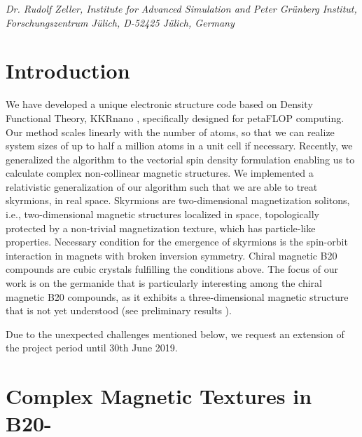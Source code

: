 \documentclass [a4paper, 12pt]{article}
\begin{document}
\phantom{MM} \textit{Dr. Rudolf Zeller,
Institute for Advanced Simulation and Peter Gr\"unberg Institut, Forschungszentrum J\"ulich, D-52425 J\"ulich, Germany
}



\newpage



\section{Introduction}
\label{sec:intro}
We have developed a unique electronic structure code based on Density Functional Theory, 
KKRnano \cite{zeller_towards_2008,thiess_massively_2012,bornemann_large-scale_nodate},
specifically designed for petaFLOP computing. Our method scales linearly
with the number of atoms, so that we can realize system sizes of up to 
half a million atoms in a unit cell if necessary.
Recently, we generalized the algorithm to the vectorial spin density formulation enabling us
to calculate complex non-collinear magnetic structures. We implemented a relativistic 
generalization  of our algorithm  such that we are able to treat skyrmions,
in real space. Skyrmions are two-dimensional magnetization solitons, i.e., two-dimensional
magnetic structures localized in space, topologically protected by a non-trivial
magnetization texture, which has particle-like properties. Necessary condition for the 
emergence of skyrmions is the spin-orbit interaction in magnets with broken inversion symmetry.
Chiral magnetic B20 compounds are cubic crystals fulfilling the conditions above. 
The focus of our work is on the germanide  that is particularly
interesting among the chiral magnetic B20 compounds, as it exhibits a three-dimensional magnetic structure
that is not yet understood (see preliminary results
\cite{tanigaki_real-space_2015,rybakov_new_2016,bornemann_investigation_2017,bornemann_large-scale_2018}).

Due to the unexpected challenges mentioned below,
we request an extension of the project period until 30th June 2019.


\section{Complex Magnetic Textures in B20-}
\label{sec:mnge}
\end{document}
